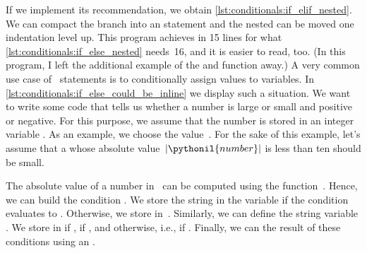 If we implement its recommendation, we obtain \cref{lst:conditionals:if_elif_nested}.
We can compact the  branch into an  statement and the nested  can be moved one indentation level up.
This program achieves in 15 lines for what \cref{lst:conditionals:if_else_nested} needs~16, and it is easier to read, too.
(In this program, I left the additional example of the  and  function away.)%
%
%
%
\FloatBarrier%
\endhsection%
%
%
\label{sec:inlineIfThenElse}%
%
%
%
%
%
%
%
A very common use case of ~statements is to conditionally assign values to variables.
In \cref{lst:conditionals:if_else_could_be_inline} we display such a situation.
We want to write some code that tells us whether a number is large or small and positive or negative.
For this purpose, we assume that the number is stored in an integer variable .
As an example, we choose the value~.
For the sake of this example, let's assume that a  whose absolute value~$|\pythonil{number}|$ is less than ten should be small.

The absolute value of a number in \python\ can be computed using the function~.
Hence, we can build the condition .
We store the string  in the variable  if the condition evaluates to .
Otherwise, we store  in~.
Similarly, we can define the string variable .
We store  in  if ,  if , and  otherwise, i.e., if .
Finally, we can  the result of these conditions using an .

